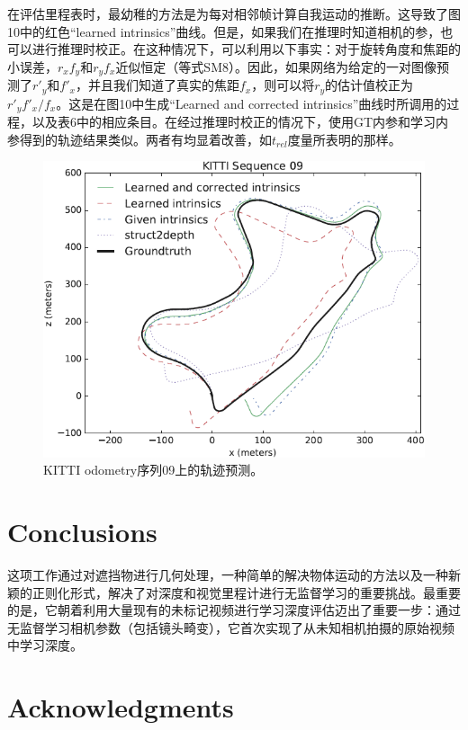 \documentclass[10pt,journal,compsoc,UTF8]{IEEEtran}
\begin{document}
在评估里程表时，最幼稚的方法是为每对相邻帧计算自我运动的推断。这导致了图10中的红色“learned intrinsics”曲线。但是，如果我们在推理时知道相机的参，也可以进行推理时校正。在这种情况下，可以利用以下事实：对于旋转角度和焦距的小误差，$r_x f_y$和$r_y f_x$近似恒定（等式SM8）。因此，如果网络为给定的一对图像预测了$r'_y$和$f'_x$，并且我们知道了真实的焦距$f_x$，则可以将$r_y$的估计值校正为$r'_yf'_x / f_x$。这是在图10中生成“Learned and corrected intrinsics”曲线时所调用的过程，以及表6中的相应条目。在经过推理时校正的情况下，使用GT内参和学习内参得到的轨迹结果类似。两者有均显着改善，如$t_{rel}$度量所表明的那样。
\begin{figure}[htbp]
  \begin{framed}
     \centering
       \includegraphics[width=1\linewidth]{imgs/10.png} 
     \caption{KITTI odometry序列09上的轨迹预测。}
  \end{framed}
\end{figure}

\section{Conclusions}
这项工作通过对遮挡物进行几何处理，一种简单的解决物体运动的方法以及一种新颖的正则化形式，解决了对深度和视觉里程计进行无监督学习的重要挑战。最重要的是，它朝着利用大量现有的未标记视频进行学习深度评估迈出了重要一步：通过无监督学习相机参数（包括镜头畸变），它首次实现了从未知相机拍摄的原始视频中学习深度。


\ifCLASSOPTIONcompsoc
  \section*{Acknowledgments}
\else
\end{document}
